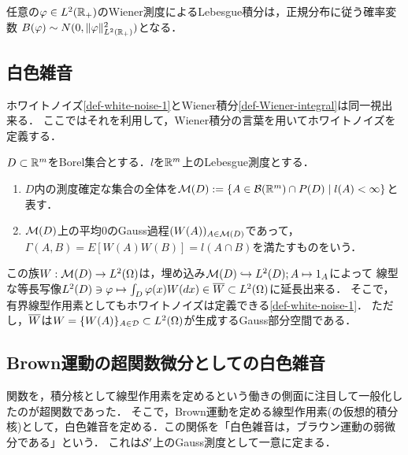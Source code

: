 \documentclass[uplatex,dvipdfmx]{jsreport}
\begin{document}
\begin{lemma}
    任意の$\varphi\in L^2(\R_+)$のWiener測度によるLebesgue積分は，正規分布に従う確率変数
    $B(\varphi)\sim N(0,\norm{\varphi}^2_{L^2(\R_+)})$となる．
\end{lemma}

\subsection{白色雑音}

\begin{tcolorbox}[colframe=ForestGreen, colback=ForestGreen!10!white,breakable,colbacktitle=ForestGreen!40!white,coltitle=black,fonttitle=\bfseries\sffamily,
title=]
    ホワイトノイズ\ref{def-white-noise-1}とWiener積分\ref{def-Wiener-integral}は同一視出来る．
    ここではそれを利用して，Wiener積分の言葉を用いてホワイトノイズを定義する．
\end{tcolorbox}

\begin{definition}
    $D\subset\R^m$をBorel集合とする．$l$を$\R^m$上のLebesgue測度とする．
    \begin{enumerate}
        \item $D$内の測度確定な集合の全体を$\M(D):=\Brace{A\in\B(\R^m)\cap P(D)\mid l(A)<\infty}$と表す．
        \item $\M(D)$上の平均$0$のGauss過程$(W(A))_{A\in\M(D)}$であって，$\Gamma(A,B)=E[W(A)W(B)]=l(A\cap B)$を満たすものをいう．
    \end{enumerate}
\end{definition}
\begin{remarks}
    この族$W:\M(D)\to L^2(\Om)$は，埋め込み$\M(D)\mono L^2(D);A\mapsto 1_A$によって
    線型な等長写像$L^2(D)\ni\varphi\mapsto\int_D\varphi(x)W(dx)\in\o{W}\subset L^2(\Om)$に延長出来る．
    そこで，有界線型作用素としてもホワイトノイズは定義できる\ref{def-white-noise-1}．
    ただし，$\o{W}$は$W=\{W(A)\}_{A\in\D}\subset L^2(\Om)$が生成するGauss部分空間である．
\end{remarks}

\subsection{Brown運動の超関数微分としての白色雑音}

\begin{tcolorbox}[colframe=ForestGreen, colback=ForestGreen!10!white,breakable,colbacktitle=ForestGreen!40!white,coltitle=black,fonttitle=\bfseries\sffamily,
title=]
    関数を，積分核として線型作用素を定めるという働きの側面に注目して一般化したのが超関数であった．
    そこで，Brown運動を定める線型作用素(の仮想的積分核)として，白色雑音を定める．この関係を「白色雑音は，ブラウン運動の弱微分である」という．
    これは$\S'$上のGauss測度として一意に定まる．
\end{tcolorbox}
\end{document}
